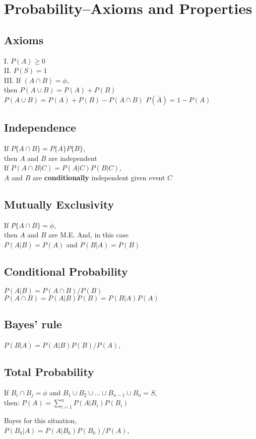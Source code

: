 \section*{Probability--Axioms and Properties}
\subsection*{Axioms}
I. $P(A)\geq 0$\\
II. $P(S) = 1$ \\
III. If $(A\cap B) = \phi$, \\then $P(A\cup B) = P(A) + P(B)$
$P(A\cup B)=P(A) + P(B) -P(A\cap B)$
$P(\bar{A})=1-P(A)$


\subsection*{Independence}
If $P\{A\cap B\} = P\{A\}P\{B\}$, \\then $A$ and $B$ are independent \\
If $P(A\cap B|C)=P(A|C)P(B|C)$, \\
$A$ and $B$ are {\bf conditionally} independent given event $C$ 

\subsection*{Mutually Exclusivity}
If $P\{A\cap B\} = \phi$, \\then $A$ and $B$ are M.E. 
And, in this case \\
$P(A|B)=P(A)$ and $P(B|A)=P(B)$


\subsection*{Conditional Probability}
$P(A|B)=P(A\cap B)/P(B)$
$P(A\cap B) = P(A|B)P(B) = P(B|A)P(A)$

\subsection*{Bayes' rule}
$P(B|A)=P(A|B)P(B)/P(A)$, \\

\subsection*{Total Probability}
If $B_i\cap B_j=\phi$ and $B_1 \cup B_2 \cup ... \cup B_{n-1} \cup B_n=S$, \\ then: $P(A)=\sum_{i=1}^{n}P(A|B_i)P(B_i)$

Bayes for this situation, \\ $P(B_k|A)=P(A|B_k)P(B_k)/P(A)$, \\








    

